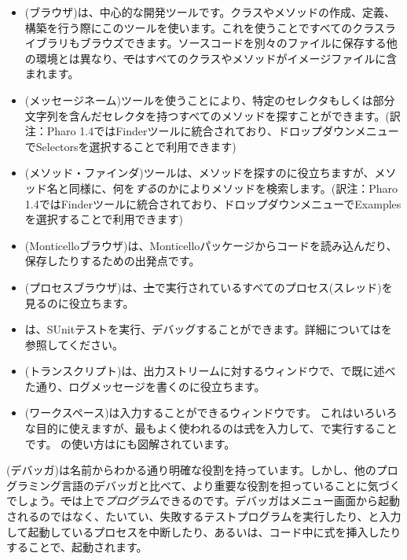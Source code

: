 \documentclass[a4paper,10pt,twoside]{book}
\begin{document}
\begin{itemize}
\item{(ブラウザ)}は、中心的な開発ツールです。クラスやメソッドの作成、定義、構築を行う際にこのツールを使います。これを使うことですべてのクラスライブラリもブラウズできます。ソースコードを別々のファイルに保存する他の環境とは異なり、\st ではすべてのクラスやメソッドがイメージファイルに含まれます。

\item{(メッセージネーム)}ツールを使うことにより、特定のセレクタもしくは部分文字列を含んだセレクタを持つすべてのメソッドを探すことができます。(訳注：Pharo 1.4ではFinderツールに統合されており、ドロップダウンメニューでSelectorsを選択することで利用できます)

\item{(メソッド・ファインダ)}ツールは、メソッドを探すのに役立ちますが、メソッド名と同様に、何を\emph{する}のかによりメソッドを検索します。(訳注：Pharo 1.4ではFinderツールに統合されており、ドロップダウンメニューでExamplesを選択することで利用できます)

\item{(Monticelloブラウザ)}は、Monticelloパッケージからコードを読み込んだり、保存したりするための出発点です。

\item{(プロセスブラウザ)}は、\st 上で実行されているすべてのプロセス(スレッド)を見るのに役立ちます。

\item{}は、SUnitテストを実行、デバッグすることができます。詳細についてはを参照してください。

\item{(トランスクリプト)}は、出力ストリームに対するウィンドウで、で既に述べた通り、ログメッセージを書くのに役立ちます。

\item{(ワークスペース)}は入力することができるウィンドウです。
          これはいろいろな目的に使えますが、最もよく使われるのは\st 式を入力して、で実行することです。
          の使い方はにも図解されています。
\end{itemize}

(デバッガ)は名前からわかる通り明確な役割を持っています。しかし、他のプログラミング言語のデバッガと比べて、より重要な役割を担っていることに気づくでしょう。\st では上で\emph{プログラム}できるのです。デバッガはメニュー画面から起動されるのではなく、たいてい、失敗するテストプログラムを実行したり、と入力して起動しているプロセスを中断したり、あるいは、コード中に式を挿入したりすることで、起動されます。
\end{document}
